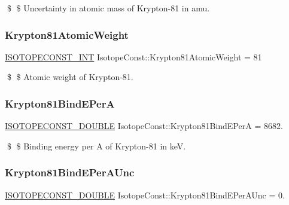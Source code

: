 \$ \$ Uncertainty in atomic mass of Krypton-\/81 in amu. \mbox{\label{group___isotope_const-_krypton-_kr81_ga9f7b675861fd1487010622ee74c86292}} 
\subsubsection{\texorpdfstring{Krypton81\+Atomic\+Weight}{Krypton81AtomicWeight}}
{\footnotesize\ttfamily \mbox{\hyperlink{group___isotope_const-_macros_ga5f18360b3e99483a35c32d789e62621c}{I\+S\+O\+T\+O\+P\+E\+C\+O\+N\+S\+T\+\_\+\+I\+NT}} Isotope\+Const\+::\+Krypton81\+Atomic\+Weight = 81}

\$ \$ Atomic weight of Krypton-\/81. \mbox{\label{group___isotope_const-_krypton-_kr81_ga803029b8d6a68431e713ce42d0d8493c}} 
\subsubsection{\texorpdfstring{Krypton81\+Bind\+E\+PerA}{Krypton81BindEPerA}}
{\footnotesize\ttfamily \mbox{\hyperlink{group___isotope_const-_macros_ga8f45a7272ce02c0b4c65c44636ed719a}{I\+S\+O\+T\+O\+P\+E\+C\+O\+N\+S\+T\+\_\+\+D\+O\+U\+B\+LE}} Isotope\+Const\+::\+Krypton81\+Bind\+E\+PerA = 8682.}

\$ \$ Binding energy per A of Krypton-\/81 in keV. \mbox{\label{group___isotope_const-_krypton-_kr81_gaafb38bea9dfce500e7da635f4dd94ce6}} 
\subsubsection{\texorpdfstring{Krypton81\+Bind\+E\+Per\+A\+Unc}{Krypton81BindEPerAUnc}}
{\footnotesize\ttfamily \mbox{\hyperlink{group___isotope_const-_macros_ga8f45a7272ce02c0b4c65c44636ed719a}{I\+S\+O\+T\+O\+P\+E\+C\+O\+N\+S\+T\+\_\+\+D\+O\+U\+B\+LE}} Isotope\+Const\+::\+Krypton81\+Bind\+E\+Per\+A\+Unc = 0.}

